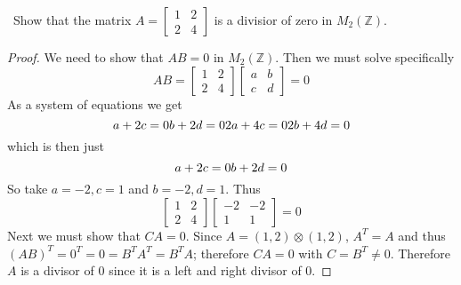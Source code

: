 \documentclass[11pt]{amsart}
\begin{document}
\medskip {}\ Show that the matrix $A = \begin{bmatrix}
	1 & 2 \\
	2 & 4
\end{bmatrix}$ is a divisior of zero in $M_2(\mathbb{Z})$.
\begin{proof}
	We need to show that $AB = 0$ in $M_2(\mathbb{Z}).$ Then we must solve specifically 
	\begin{equation*}
		AB = \begin{bmatrix}
	1 & 2 \\
	2 & 4
\end{bmatrix} \begin{bmatrix}
	a & b \\
	c& d 
\end{bmatrix} = 0
	\end{equation*}
	As a system of equations we get
	\begin{equation*}
		a + 2c = 0 \\
		b + 2d = 0 \\
		2a + 4c = 0 \\
		2b + 4d = 0
	\end{equation*}
	which is then just
	\begin{equation*}
		a + 2c = 0 \\
		b + 2d = 0 \\
	\end{equation*}
	So take $a = -2, c = 1$ and $b = -2, d = 1$.
	Thus
	\begin{equation*}
		\begin{bmatrix}
			1 & 2 \\
			2 & 4
		\end{bmatrix} \begin{bmatrix}
			-2 & -2 \\
			1 & 1
		\end{bmatrix} = 0
	\end{equation*}
	Next we must show that $CA = 0$. Since
	$A = (1,2) \otimes (1,2)$, $A^T = A$ and thus
	$(AB)^T = 0^T = 0 = B^TA^T=B^TA$; therefore $CA = 0$ with $C = B^T \neq 0$. Therefore $A$ is a divisor of $0$ since it is a left and right divisor of $0.$
\end{proof}
\end{document}
